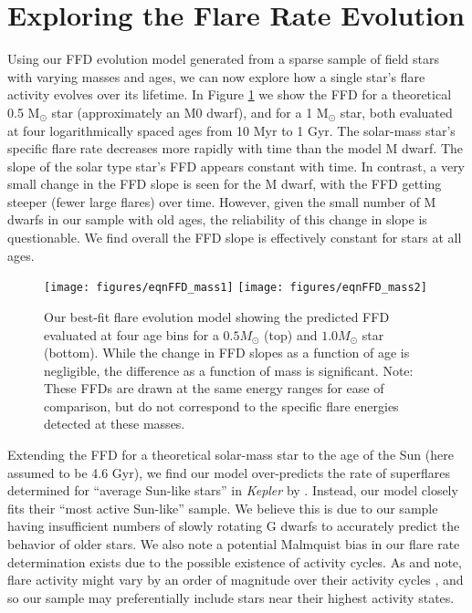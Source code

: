 \documentclass[preprint2]{aastex62}
\newcommand{\Kepler}{\textsl{Kepler}\xspace}
\begin{document}
\section{Exploring the Flare Rate Evolution}
\label{sec:model}


Using our FFD evolution model generated from a sparse sample of field stars with varying masses and ages, we can now explore how a single star's flare activity evolves over its lifetime. In Figure \ref{fig:model} we show the FFD for a theoretical 0.5 M$_\odot$ star (approximately an M0 dwarf), and for a 1 M$_\odot$ star, both evaluated at four logarithmically spaced ages from 10 Myr to 1 Gyr. The solar-mass star's specific flare rate decreases more rapidly with time than the model M dwarf. The slope of the solar type star's FFD appears constant with time. In contrast, a very small change in the FFD slope is seen for the M dwarf, with the FFD getting steeper (fewer large flares) over time. However, given the small number of M dwarfs in our sample with old ages, the reliability of this change in slope is questionable. We find overall the FFD slope is effectively constant for stars at all ages.


\begin{figure}[!t]
\centering
\texttt{[image: figures/eqnFFD\_mass1]}
\texttt{[image: figures/eqnFFD\_mass2]}
\caption{
Our best-fit flare evolution model showing the predicted FFD evaluated at four age bins for a $0.5 M_\odot$ (top) and $1.0 M_\odot$ star (bottom). While the change in FFD slopes as a function of age is negligible, the difference as a function of mass is significant. Note: These FFDs are drawn at the same energy ranges for ease of comparison, but do not correspond to the specific flare energies detected at these masses.
}
\label{fig:model}
\end{figure}




Extending the FFD for a theoretical solar-mass star to the age of the Sun (here assumed to be 4.6 Gyr), we find our model over-predicts the rate of superflares determined for ``average Sun-like stars'' in \Kepler by \citet{shibayama2013}. Instead, our model closely fits their ``most active Sun-like'' sample. We believe this is due to our sample having insufficient numbers of slowly rotating G dwarfs to accurately predict the behavior of older stars. We also note a potential Malmquist bias in our flare rate determination exists due to the possible existence of activity cycles. As \citet{shibayama2013} and \citet{clarke2018} note, flare activity might vary by an order of magnitude over their activity cycles \citep[see also][]{veronig2002}, and so our sample may preferentially include stars near their highest activity states.
\end{document}
